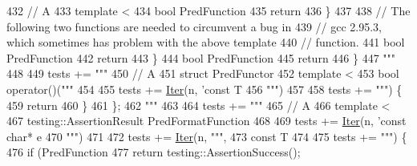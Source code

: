 \begin{DoxyCode}
{{{{{{{{{432 \textcolor{stringliteral}{// A %
433 \textcolor{stringliteral}{template <%
434 \textcolor{stringliteral}{bool PredFunction%
435 \textcolor{stringliteral}{  return %
436 \textcolor{stringliteral}{\}}
437 \textcolor{stringliteral}{}
438 \textcolor{stringliteral}{// The following two functions are needed to circumvent a bug in}
439 \textcolor{stringliteral}{// gcc 2.95.3, which sometimes has problem with the above template}
440 \textcolor{stringliteral}{// function.}
441 \textcolor{stringliteral}{bool PredFunction%
442 \textcolor{stringliteral}{  return %
443 \textcolor{stringliteral}{\}}
444 \textcolor{stringliteral}{bool PredFunction%
445 \textcolor{stringliteral}{  return %
446 \textcolor{stringliteral}{\}}
447 \textcolor{stringliteral}{"""} %
448 
449   tests += \textcolor{stringliteral}{"""}
450 \textcolor{stringliteral}{// A %
451 \textcolor{stringliteral}{struct PredFunctor%
452 \textcolor{stringliteral}{  template <%
453 \textcolor{stringliteral}{  bool operator()("""} %
454 
455   tests += \hyperlink{namespacegen__gtest__pred__impl_ac016218b7c9437d1d5ac85c574c83069}{Iter}(n, \textcolor{stringliteral}{'const T%
456 \textcolor{stringliteral}{                  """})
457 
458   tests += \textcolor{stringliteral}{""") \{}
459 \textcolor{stringliteral}{    return %
460 \textcolor{stringliteral}{  \}}
461 \textcolor{stringliteral}{\};}
462 \textcolor{stringliteral}{"""} %
463 
464   tests += \textcolor{stringliteral}{"""}
465 \textcolor{stringliteral}{// A %
466 \textcolor{stringliteral}{template <%
467 \textcolor{stringliteral}{testing::AssertionResult PredFormatFunction%
468 
469   tests += \hyperlink{namespacegen__gtest__pred__impl_ac016218b7c9437d1d5ac85c574c83069}{Iter}(n, \textcolor{stringliteral}{'const char* e%
470 \textcolor{stringliteral}{                                             """})
471 
472   tests += \hyperlink{namespacegen__gtest__pred__impl_ac016218b7c9437d1d5ac85c574c83069}{Iter}(n, \textcolor{stringliteral}{""",}
473 \textcolor{stringliteral}{                                             const T%
474 
475   tests += \textcolor{stringliteral}{""") \{}
476 \textcolor{stringliteral}{  if (PredFunction%
477 \textcolor{stringliteral}{    return testing::AssertionSuccess();}
}}}}}}}}}}}}}}}}}}}}}}}}}}}}
\end{DoxyCode}
